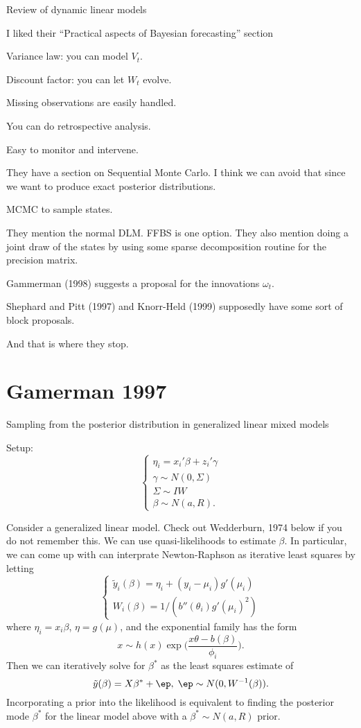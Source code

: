 \documentclass{article}
\begin{document}
\begin{outline}

\1 Review of dynamic linear models

\1 I liked their ``Practical aspects of Bayesian forecasting'' section

  \2 Variance law: you can model $V_t$.

  \2 Discount factor: you can let $W_t$ evolve.
  
  \2 Missing observations are easily handled.
  
  \2 You can do retrospective analysis.
  
  \2 Easy to monitor and intervene.

\1 They have a section on Sequential Monte Carlo.  I think we can avoid that
since we want to produce exact posterior distributions.

\1 MCMC to sample states.

\2 They mention the normal DLM.  FFBS is one option.  They also mention doing a
joint draw of the states by using some sparse decomposition routine for the
precision matrix.

\2 Gammerman (1998) suggests a proposal for the innovations $\omega_t$.

\2 Shephard and Pitt (1997) and Knorr-Held (1999) supposedly have some sort of
block proposals.

\2 And that is where they stop.

\end{outline}

\section{Gamerman 1997}

Sampling from the posterior distribution in generalized linear mixed models

Setup:
\[
\begin{cases}
\eta_i = x_i' \beta + z_i' \gamma \\
\gamma \sim N(0, \Sigma) \\
\Sigma \sim IW \\
\beta \sim N(a, R).
\end{cases}
\]

Consider a generalized linear model.  Check out Wedderburn, 1974 below if you do
not remember this.  We can use quasi-likelihoods to estimate $\beta$.  In
particular, we can come up with can interprate Newton-Raphson as iterative least
squares by letting
\[
\begin{cases}
\tilde y_i(\beta) = \eta_i + (y_i - \mu_i) g'(\mu_i) \\
W_i(\beta) = 1 / (b''(\theta_i) g'(\mu_i)^2)
\end{cases}
\]
where $\eta_i = x_i \beta$, $\eta = g(\mu)$, and the exponential family has the
form
\[
x \sim h(x) \exp \Big( \frac{x \theta - b(\beta)}{\phi_i} \Big).
\]
Then we can iteratively solve for $\beta^*$ as the least squares estimate of
\[
\tilde y(\beta) = X \beta^* + \ep, \; \ep \sim N(0, W^{-1}(\beta)).
\]
Incorporating a prior into the likelihood is equivalent to finding the posterior
mode $\beta^*$ for the linear model above with a $\beta^* \sim N(a, R)$ prior.
\end{document}
